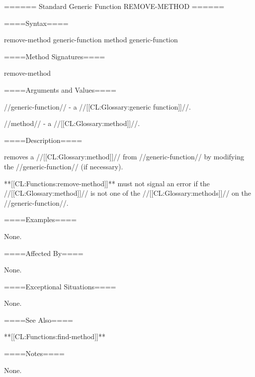 ====== Standard Generic Function REMOVE-METHOD ======

====Syntax====

\DefgenWithValues remove-method {generic-function method} {generic-function}

====Method Signatures====

\Defmeth remove-method {}

====Arguments and Values====

//generic-function// - a //[[CL:Glossary:generic function]]//.

//method// - a //[[CL:Glossary:method]]//.

====Description====

 removes a //[[CL:Glossary:method]]// from //generic-function// by modifying the //generic-function// (if necessary).

**[[CL:Functions:remove-method]]** must not signal an error if the //[[CL:Glossary:method]]// is not one of the //[[CL:Glossary:methods]]// on the //generic-function//.

====Examples====

None.

====Affected By====

None.

====Exceptional Situations====

None.

====See Also====

**[[CL:Functions:find-method]]**

====Notes====

None.


